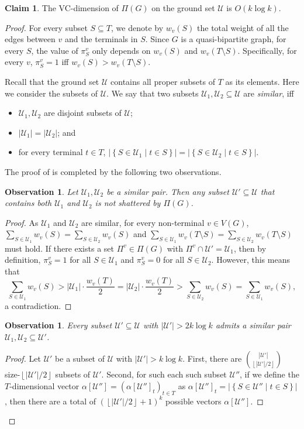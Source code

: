 \documentclass[11pt]{article}
\newtheorem{observation}[theorem]{Observation}
\theoremstyle{definition}
\newtheorem{claim}[theorem]{Claim}
\newcommand{\set}[1]{\left\{ #1 \right\}}
\newcommand{\uset}{{\mathcal U}}
\def\floor#1{\left\lfloor #1 \right\rfloor}
\newcounter{note}
\begin{document}
\begin{claim}
\label{clm: VC-dim}
The VC-dimension of $\Pi(G)$ on the ground set $\uset$ is $O(k \log k)$.
\end{claim}
\begin{proof}
For every subset $S \subseteq T$, we denote by $w_v(S)$ the total weight of all the edges between $v$ and the terminals in $S$. Since $G$ is a quasi-bipartite graph, for every $S$, the value of $\pi^v_S$ only depends on $w_v(S)$ and $w_v(T\setminus S)$. Specifically, for every $v$, $\pi^v_S=1$ iff $w_v(S)>w_v(T\setminus S)$.

Recall that the ground set $\uset$ contains all proper subsets of $T$ as its elements. Here we consider the subsets of $\uset$. We say that two subsets $\uset_1,\uset_2\subseteq \uset$ are \emph{similar}, iff
\begin{itemize}
\item $\uset_1,\uset_2$ are disjoint subsets of $\uset$;
\item $|\uset_1|=|\uset_2|$; and
\item for every terminal $t\in T$, $\big|\set{S\in \uset_1\mid t\in S}\big|=\big|\set{S\in \uset_2\mid t\in S}\big|$.
\end{itemize}
The proof of  is completed by the following two observations.


\begin{observation}
Let $\uset_1,\uset_2$ be a similar pair. Then any subset $\uset'\subseteq \uset$ that contains both $\uset_1$ and $\uset_2$ is not shattered by $\Pi(G)$.
\end{observation}
\begin{proof}
As $\uset_1$ and $\uset_2$ are similar, for every non-terminal $v\in V(G)$, $\sum_{S\in \uset_1} w_{v}(S) = \sum_{S \in \uset_2} w_{v}(S)$ and $\sum_{S \in \uset_1} w_v(T \setminus S) = \sum_{S \in \uset_2} w_v(T \setminus S)$ must hold. 
If there exists a set $\Pi^v\in \Pi(G)$ with $\Pi^v\cap \uset'=\uset_1$, then by definition,
$\pi^v_S=1$ for all $S \in \mathcal{U}_1$ and $\pi^v_S=0$ for all $S \in \mathcal{U}_2$. 
However, this means that
\[
\sum_{S\in \uset_1} w_{v}(S)> |\uset_1|\cdot \frac{w_{v}(T)}{2}= |\uset_2|\cdot \frac{w_{v}(T)}{2}
> \sum_{S\in \uset_2} w_{v}(S) = \sum_{S\in \uset_1} w_{v}(S),
\]
a contradiction.
\end{proof}

\begin{observation}
Every subset $\uset'\subseteq \uset$ with $|\uset'|>2k\log k$ admits a similar pair $\uset_1,\uset_2\subseteq \uset'$.
\end{observation}
\begin{proof}
Let $\uset'$ be a subset of $\uset$ with $|\uset'|>k\log k$.
First, there are $\binom{|\uset'|}{\floor{|\uset'|/2}}$ size-$\floor{|\uset'|/2}$ subsets of $\uset'$. Second, for such each such subset $\uset''$, if we define the $T$-dimensional vector $\alpha[\uset'']=(\alpha[\uset'']_t)_{t\in T}$ as
$\alpha[\uset'']_t=\big|\set{S\in \uset''\mid t\in S}\big|$, then there are a total of $(\floor{|\uset'|/2}+1)^k$ possible vectors $\alpha[\uset'']$.


\end{proof}
\end{proof}
\end{document}
